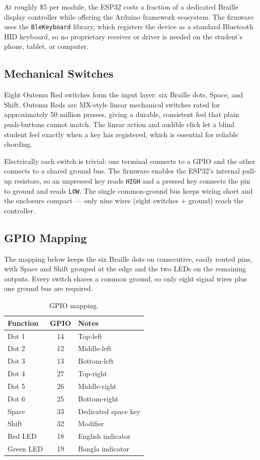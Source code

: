 \documentclass[11pt,a4paper,twoside]{article}
\begin{document}
At roughly \$5 per module, the ESP32 costs a fraction of a dedicated
Braille display controller while offering the Arduino framework
ecosystem. The firmware uses the \texttt{BleKeyboard} library, which
registers the device as a standard Bluetooth HID keyboard, so no
proprietary receiver or driver is needed on the student's phone, tablet,
or computer.

\subsection{Mechanical Switches}
Eight Outemu Red switches form the input layer: six Braille dots, Space,
and Shift. Outemu Reds are MX-style linear mechanical switches rated for
approximately 50 million presses, giving a durable, consistent feel that
plain push-buttons cannot match. The linear action and audible click let
a blind student feel exactly when a key has registered, which is
essential for reliable chording.

Electrically each switch is trivial: one terminal connects to a GPIO and
the other connects to a shared ground bus. The firmware enables the
ESP32's internal pull-up resistors, so an unpressed key reads \texttt{HIGH}
and a pressed key connects the pin to ground and reads \texttt{LOW}. The
single common-ground bus keeps wiring short and the enclosure compact ---
only nine wires (eight switches + ground) reach the controller.

\subsection{GPIO Mapping}
The mapping below keeps the six Braille dots on consecutive, easily
routed pins, with Space and Shift grouped at the edge and the two LEDs on
the remaining outputs. Every switch shares a common ground, so only eight
signal wires plus one ground bus are required.

\begin{table}[H]\centering
\caption{GPIO mapping.}\label{tab:gpio}
\begin{tabular}{l c l}\toprule
\bfseries Function & \bfseries GPIO & \bfseries Notes \\\midrule
Dot 1 & 14 & Top-left \\
Dot 2 & 12 & Middle-left \\
Dot 3 & 13 & Bottom-left \\
Dot 4 & 27 & Top-right \\
Dot 5 & 26 & Middle-right \\
Dot 6 & 25 & Bottom-right \\
Space & 33 & Dedicated space key \\
Shift & 32 & Modifier \\
Red LED & 18 & English indicator \\
Green LED & 19 & Bangla indicator \\\bottomrule
\end{tabular}\end{table}
\end{document}
